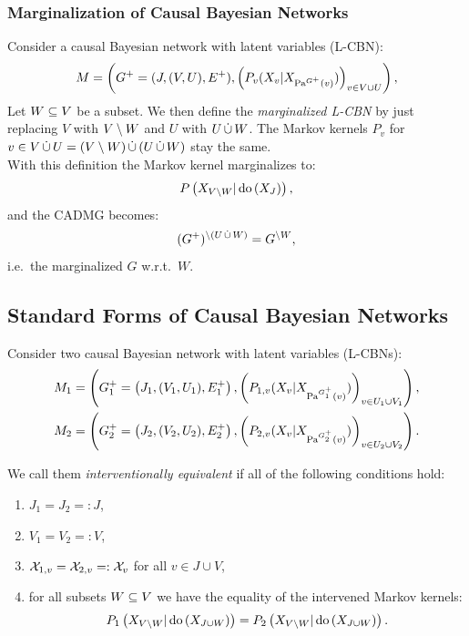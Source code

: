 \subsubsection{Marginalization of Causal Bayesian Networks}

\begin{Def}
    Consider a causal Bayesian network with latent variables (L-CBN): 
     \[ M= \left ( G^+=(J,(V,U),E^+), \left ( P_v(X_v|X_{\mathrm{Pa}^{G^+}(v)})\right )_{v \in V \cup U}\right ),  \]
    Let $W \subseteq V$ be a subset.
    We then define the \emph{marginalized L-CBN} by just replacing $V$ with $V \setminus W$ and $U$ with $U \,\dot{\cup}\, W$. 
    The Markov kernels $P_v$ for $v \in V \,\dot{\cup}\, U = (V \setminus W) \,\dot{\cup}\, (U \,\dot{\cup}\, W)$ stay the same.\\
    With this definition the \observational Markov kernel marginalizes to:
    \[ P\left ( X_{V\setminus W}|\operatorname{do}\left ( X_J\right )\right ),  \]
    and the \observational CADMG becomes:
    \[ (G^+)^{\setminus (U \,\dot{\cup}\, W)} = G^{\setminus W},\]
    i.e.\ the marginalized $G$ w.r.t.\ $W$.
\end{Def}

\subsection{Standard Forms of Causal Bayesian Networks}

\begin{Def}
    Consider two  causal Bayesian network with latent variables (L-CBNs):
    \begin{align*}
        M_1 &= \left ( G^+_1=\left ( J_1,(V_1,U_1),E^+_1 \right ), \left ( P_{1,v}( X_v|X_{\mathrm{Pa}^{G^+_1}(v)}) \right )_{v \in U_1 \cup V_1} \right ),\\
        M_2 &= \left ( G^+_2=\left ( J_2,(V_2,U_2),E^+_2 \right ), \left ( P_{2,v} ( X_v|X_{\mathrm{Pa}^{G^+_2}(v)}) \right )_{v \in U_2 \cup V_2} \right ).
    \end{align*}

    We call them \emph{interventionally equivalent} if all of the following conditions hold:
    \begin{enumerate}
        \item $J_1 = J_2 =:J$,
        \item $V_1 = V_2 =:V$,
        \item $\mathcal{X}_{1,v} = \mathcal{X}_{2,v} =: \mathcal{X}_v$ for all $v \in J \cup V$,
        \item for all subsets $W \subseteq V$ we have the equality of the intervened Markov kernels:
            \[P_1\left ( X_{V \setminus W}| \operatorname{do}\left ( X_{J \cup W} \right )\right )  = P_2\left ( X_{V\setminus W}| \operatorname{do}\left ( X_{J \cup W} \right )\right ).\]
    \end{enumerate}
\end{Def}


